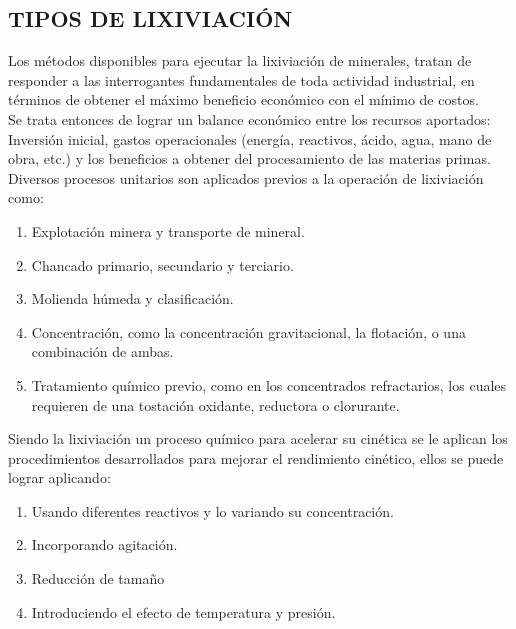 \subsection{TIPOS DE LIXIVIACI\'ON}

Los m\'etodos disponibles para ejecutar la lixiviaci\'on de minerales, tratan de responder a las interrogantes fundamentales de toda actividad industrial, en t\'erminos de obtener el m\'aximo beneficio econ\'omico con el m\'inimo de costos.\\
Se trata entonces de lograr un balance econ\'omico entre los recursos aportados: Inversi\'on inicial, gastos operacionales (energ\'ia, reactivos, \'acido, agua, mano de obra, etc.) y los beneficios a obtener del procesamiento de las materias primas.\\

Diversos procesos unitarios son aplicados previos a la operaci\'on de lixiviaci\'on como:
\begin{enumerate}
 \item  Explotaci\'on minera y transporte de mineral.
\item  Chancado primario, secundario y terciario.
 \item  Molienda h\'umeda y clasificaci\'on.
 \item  Concentraci\'on, como la concentraci\'on gravitacional, la flotaci\'on, o una combinaci\'on de ambas.
 \item  Tratamiento qu\'imico previo, como en los concentrados refractarios, los cuales requieren de una tostaci\'on oxidante, reductora o clorurante.
\end{enumerate}



Siendo la lixiviaci\'on un proceso qu\'imico para acelerar su cin\'etica se le aplican los procedimientos desarrollados para mejorar el rendimiento cin\'etico, ellos se puede lograr aplicando:
\begin{enumerate}
 \item  Usando diferentes reactivos y lo variando su concentraci\'on.
 \item  Incorporando agitaci\'on.
 \item  Reducci\'on de tama\~no
 \item  Introduciendo el efecto de temperatura y presi\'on.
\end{enumerate}


